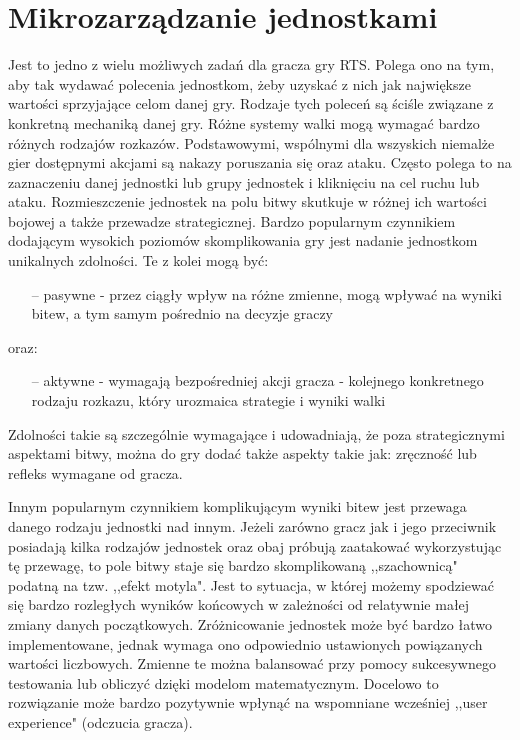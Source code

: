 \documentclass[12pt]{report}
\begin{document}
\section {Mikrozarządzanie jednostkami} 
Jest to jedno z wielu możliwych zadań dla gracza gry RTS. Polega ono na tym, aby tak wydawać polecenia jednostkom, żeby uzyskać z nich jak największe wartości sprzyjające celom danej gry. Rodzaje tych poleceń są ściśle związane z konkretną mechaniką danej gry. Różne systemy walki mogą wymagać bardzo różnych rodzajów rozkazów. Podstawowymi, wspólnymi dla wszyskich niemalże gier dostępnymi akcjami są nakazy poruszania się oraz ataku. Często polega to na zaznaczeniu danej jednostki lub grupy jednostek i kliknięciu na cel ruchu lub ataku. Rozmieszczenie jednostek na polu bitwy skutkuje w różnej ich wartości bojowej a także przewadze strategicznej. Bardzo popularnym czynnikiem dodającym wysokich poziomów skomplikowania gry jest nadanie jednostkom unikalnych zdolności. Te z kolei mogą być: 

\begin{itemize}
\item[--] pasywne - przez ciągły wpływ na różne zmienne, mogą wpływać na wyniki bitew, a tym samym pośrednio na decyzje graczy
\end{itemize} 
oraz:
\begin{itemize}
\item[--] aktywne - wymagają bezpośredniej akcji gracza - kolejnego konkretnego rodzaju rozkazu, który urozmaica strategie i wyniki walki 
\end{itemize} 

Zdolności takie są szczególnie wymagające i udowadniają, że poza strategicznymi aspektami bitwy, można do gry dodać także aspekty takie jak: zręczność lub refleks wymagane od gracza.

Innym popularnym czynnikiem komplikującym wyniki bitew jest przewaga danego rodzaju jednostki nad innym. Jeżeli zarówno gracz jak i jego przeciwnik posiadają kilka rodzajów jednostek oraz obaj próbują zaatakować wykorzystując tę przewagę, to pole bitwy staje się bardzo skomplikowaną ,,szachownicą" podatną na tzw. ,,efekt motyla". Jest to sytuacja, w której możemy spodziewać się bardzo rozległych wyników końcowych w zależności od relatywnie małej zmiany danych początkowych. Zróżnicowanie jednostek może być bardzo łatwo implementowane, jednak wymaga ono odpowiednio ustawionych powiązanych wartości liczbowych. Zmienne te można balansować przy pomocy sukcesywnego testowania lub obliczyć dzięki modelom matematycznym. Docelowo to rozwiązanie może bardzo pozytywnie wpłynąć na wspomniane wcześniej ,,user experience" (odczucia gracza).
\end{document}
